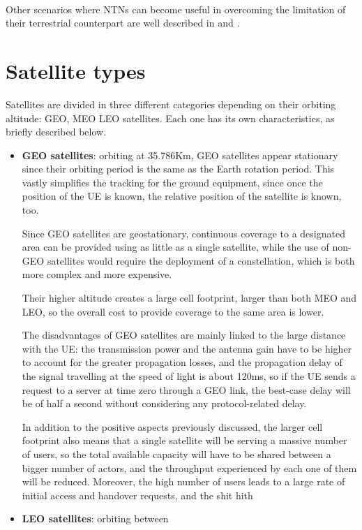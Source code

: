 \paragraph{} Other scenarios where \ac{NTNs} can become useful in overcoming the limitation of their terrestrial counterpart are well described in \cite{ntn-6g-era-challenges-giordani} and \cite{potential-multilayered-nierarchical-ntn-wang}.

\section{Satellite types}
Satellites are divided in three different categories depending on their orbiting altitude: \ac{GEO}, \ac{MEO} \ac{LEO} satellites. Each one has its own characteristics, as briefly described below.
\begin{itemize}
    \item \textbf{\ac{GEO} satellites}: orbiting at 35.786Km, \ac{GEO} satellites appear stationary since their orbiting period is the same as the Earth rotation period. This vastly simplifies the tracking for the ground equipment, since once the position of the \ac{UE} is known, the relative position of the satellite is known, too.
    
    Since \ac{GEO} satellites are geostationary, continuous coverage to a designated area can be provided using as little as a single satellite, while the use of non-\ac{GEO} satellites would require the deployment of a constellation, which is both more complex and more expensive.

    Their higher altitude creates a large cell footprint, larger than both \ac{MEO} and \ac{LEO}, so the overall cost to provide coverage to the same area is lower.

    The disadvantages of \ac{GEO} satellites are mainly linked to the large distance with the \ac{UE}: the transmission power and the antenna gain have to be higher to account for the greater propagation losses, and the propagation delay of the signal travelling at the speed of light is about 120ms, so if the \ac{UE} sends a request to a server at time zero through a \ac{GEO} link, the best-case delay will be of half a second without considering any protocol-related delay.

    In addition to the positive aspects previously discussed, the larger cell footprint also means that a single satellite will be serving a massive number of users, so the total available capacity will have to be shared between a bigger number of actors, and the throughput experienced by each one of them will be reduced. 
    Moreover, the high number of users leads to a large rate of initial access and handover requests, and the shit hith

    \item \textbf{\ac{LEO} satellites}: orbiting between 
\end{itemize}

